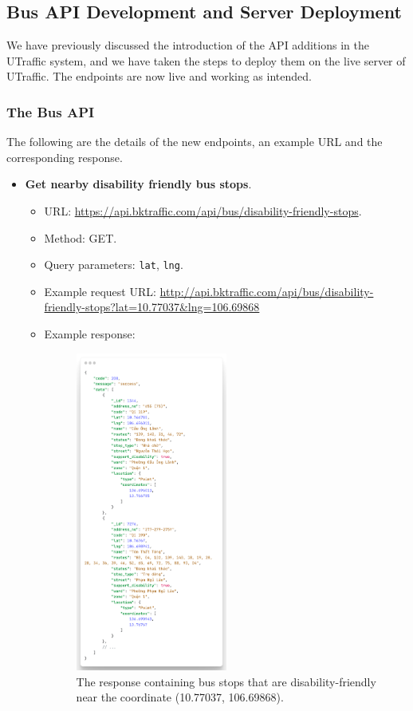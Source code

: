 \subsection{Bus API Development and Server Deployment}
We have previously discussed the introduction of the API additions in the UTraffic system, and we have taken the steps to deploy them on the live server of UTraffic. The endpoints are now live and working as intended.
\subsubsection{The Bus API}
The following are the details of the new endpoints, an example URL and the corresponding response.

\begin{itemize}
    \item \textbf{Get nearby disability friendly bus stops}.
    \begin{itemize}
        \item URL: \url{https://api.bktraffic.com/api/bus/disability-friendly-stops}.
        \item Method: GET.
        \item Query parameters: \lstinline{lat}, \lstinline{lng}.
        \item Example request URL: \url{http://api.bktraffic.com/api/bus/disability-friendly-stops?lat=10.77037&lng=106.69868}
        \item Example response:
        \begin{figure}[H]
            \centering
            \includegraphics[width=0.5\textwidth]{assets/images/Implementation/nearby_disable_response.png}
            \caption{The response containing bus stops that are disability-friendly near the coordinate (10.77037, 106.69868).}
            \label{fig:nearby_disable_response}
        \end{figure}
    \end{itemize}


\end{itemize}
